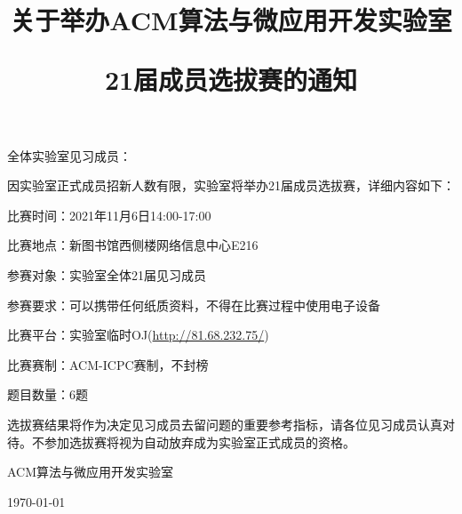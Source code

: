 \documentclass[UTF-8, 12pt]{ctexart}
\title{关于举办ACM算法与微应用开发实验室 \par 21届成员选拔赛的通知}
\date{}
\begin{document}
	\maketitle
	\thispagestyle{empty}
	\noindent 全体实验室见习成员：\par
	因实验室正式成员招新人数有限，实验室将举办21届成员选拔赛，详细内容如下： \par
	比赛时间：2021年11月6日14:00-17:00 \par
	比赛地点：新图书馆西侧楼网络信息中心E216 \par
	参赛对象：实验室全体21届见习成员 \par
	参赛要求：可以携带任何纸质资料，不得在比赛过程中使用电子设备 \par
	比赛平台：实验室临时OJ\quad (\url{http://81.68.232.75/}) \par
	比赛赛制：ACM-ICPC赛制，不封榜 \par
	题目数量：6题 \par
	选拔赛结果将作为决定见习成员去留问题的重要参考指标，请各位见习成员认真对待。不参加选拔赛将视为自动放弃成为实验室正式成员的资格。 \par
	\hfill ACM算法与微应用开发实验室 \par
	\hfill \today
\end{document}
